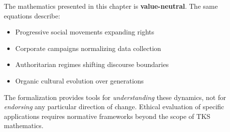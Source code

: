 \begin{tcolorbox}[colback=red!5!white,colframe=red!75!black,title=\textbf{Methodological Note}]
The mathematics presented in this chapter is \textbf{value-neutral}. The same equations
describe:
\begin{itemize}
    \item Progressive social movements expanding rights
    \item Corporate campaigns normalizing data collection
    \item Authoritarian regimes shifting discourse boundaries
    \item Organic cultural evolution over generations
\end{itemize}
The formalization provides tools for \textit{understanding} these dynamics, not for
\textit{endorsing} any particular direction of change. Ethical evaluation of specific
applications requires normative frameworks beyond the scope of TKS mathematics.
\end{tcolorbox}

